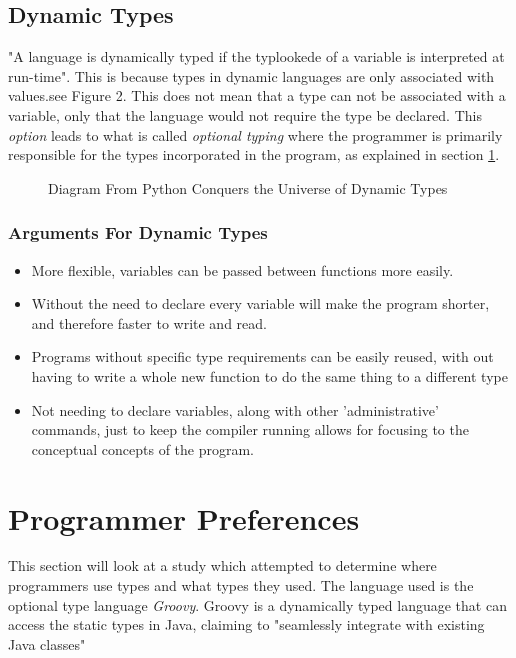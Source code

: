 \documentclass{sig-alternate}
\begin{document}
\subsection{Dynamic Types} \label{dynamic}
"A language is dynamically typed if the typlookede of a variable is interpreted at run-time"\cite{NomeN2009}. This is because types in dynamic languages are only associated with values\cite{Pierce2002}.see Figure 2. This does not mean that a type can not be associated with a variable, only that the language would not require the type be declared. This \emph{option} leads to what is called \emph{optional typing} where the programmer is primarily  responsible for the types incorporated in the program, as explained in section \ref{programmers}. 

\begin{figure}
\centering
{}
\caption{Diagram From Python Conquers the Universe of Dynamic Types}
\end{figure}

\subsubsection{Arguments For Dynamic Types}
\begin{itemize}
\item More flexible, variables can be passed between functions more easily.
\item Without the need to declare every variable will make the program shorter, and therefore faster to write and read.
\item Programs without specific type requirements can be easily reused, with out having to write a whole new function to do the same thing to a different type
\item Not needing to declare variables, along with other 'administrative' commands, just to keep the compiler running allows for focusing to the conceptual concepts of the program.
\end{itemize}

\section{Programmer Preferences} \label{programmers}
This section will look at a study which attempted to determine where programmers use types and what types they used. The language used is the optional type language \emph{Groovy}. Groovy is a dynamically typed language that can access the static types in Java, claiming to "seamlessly integrate with existing Java classes" \cite{Souza2014}
\end{document}
